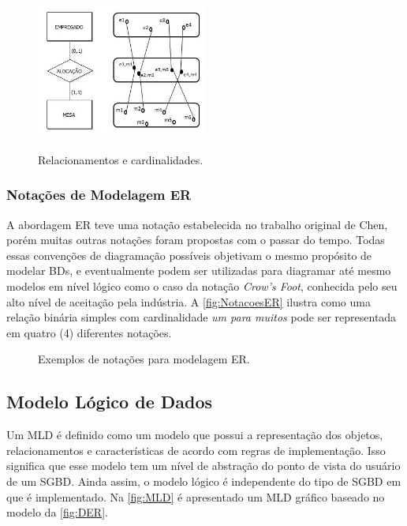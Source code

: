 \begin{figure}[htb]
	\centering
	\caption{Relacionamentos e cardinalidades.}
		\includegraphics[width=0.5\textwidth]{img/RelCard.jpg}
	\label{fig:DER2}
\end{figure}

    
\subsubsection{Notações de Modelagem ER} \label{sssec:ModeloER}

A abordagem \ac{ER} teve uma notação estabelecida no trabalho original de Chen, porém muitas outras notações foram propostas com o passar do tempo.
Todas essas convenções de diagramação possíveis objetivam o mesmo propósito de modelar \acp{BD}, e eventualmente podem ser utilizadas para diagramar até mesmo modelos em nível lógico como o caso da notação \textit{Crow's Foot}, conhecida pelo seu alto nível de aceitação pela indústria. 
A \autoref{fig:NotacoesER} ilustra como uma relação binária simples com cardinalidade \textit{um para muitos} pode ser representada em quatro (4) diferentes notações.

\begin{figure} [!htb]
    \centering
    \caption{Exemplos de notações para modelagem ER.}
    \label{fig:NotacoesER}
    
\end{figure}

    \subsection{Modelo Lógico de Dados} \label{ssec:ModelLogico}

Um \ac{MLD} é definido como um modelo que possui a representação dos objetos, relacionamentos e características de acordo com regras de implementação. 
Isso significa que esse modelo tem um nível de abstração do ponto de vista do usuário de um \ac{SGBD}. 
Ainda assim, o modelo lógico é independente do tipo de \ac{SGBD} em que é implementado. 
Na \autoref{fig:MLD} é apresentado um \ac{MLD} gráfico baseado no modelo da \autoref{fig:DER}.

